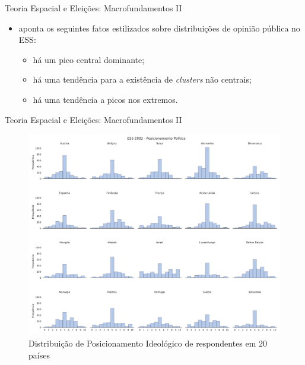 \documentclass{beamer}
\begin{document}
\begin{frame}{Teoria Espacial e Eleições: Macrofundamentos II}

  \begin{itemize}
 \item \textcite{flache2017} aponta os seguintes fatos estilizados sobre
   distribuições de opinião pública no ESS:
    \begin{itemize}
    \item  há um pico central dominante;
    \item há uma tendência para a existência de \textit{clusters} não centrais;
    \item há uma tendência a picos nos extremos.
    \end{itemize}
  \end{itemize}
  
\end{frame}

\begin{frame}{Teoria Espacial e Eleições: Macrofundamentos II}  
  \begin{figure}[H]
      \centering \includegraphics[scale = 0.2]{ims/ess_2002_plots.pdf}
    \caption{ Distribuição de Posicionamento Ideológico de respondentes em 20
      países}
    \label{fig2}
  \end{figure}
\end{frame}
\end{document}
